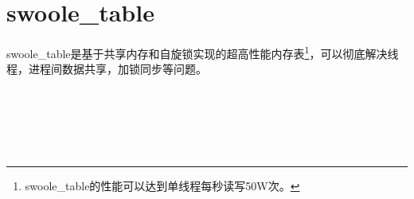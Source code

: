 \section{swoole\_table}


swoole\_table是基于共享内存和自旋锁实现的超高性能内存表\footnote{swoole\_table的性能可以达到单线程每秒读写50W次。}，可以彻底解决线程，进程间数据共享，加锁同步等问题。




\begin{lstlisting}[language=bash]

\end{lstlisting}





\begin{lstlisting}[language=bash]

\end{lstlisting}



















\begin{lstlisting}[language=bash]

\end{lstlisting}




\begin{lstlisting}[language=bash]

\end{lstlisting}




\begin{lstlisting}[language=bash]

\end{lstlisting}




\begin{lstlisting}[language=bash]

\end{lstlisting}




\begin{lstlisting}[language=bash]

\end{lstlisting}




